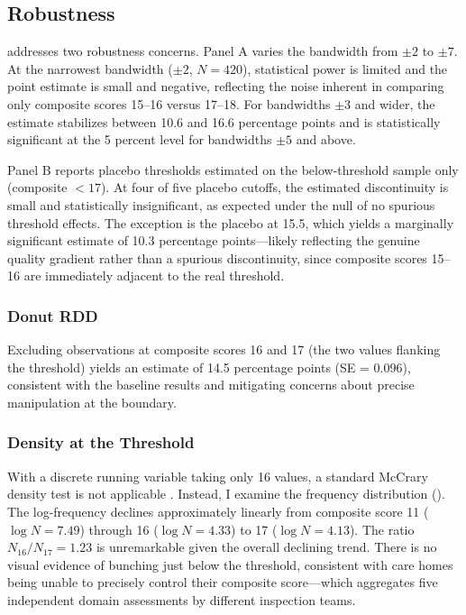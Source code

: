 \documentclass[12pt]{article}
\begin{document}
\subsection{Robustness}



 addresses two robustness concerns. Panel A varies the bandwidth from $\pm 2$ to $\pm 7$. At the narrowest bandwidth ($\pm 2$, $N = 420$), statistical power is limited and the point estimate is small and negative, reflecting the noise inherent in comparing only composite scores 15--16 versus 17--18. For bandwidths $\pm 3$ and wider, the estimate stabilizes between 10.6 and 16.6 percentage points and is statistically significant at the 5 percent level for bandwidths $\pm 5$ and above.

Panel B reports placebo thresholds estimated on the below-threshold sample only (composite $< 17$). At four of five placebo cutoffs, the estimated discontinuity is small and statistically insignificant, as expected under the null of no spurious threshold effects. The exception is the placebo at 15.5, which yields a marginally significant estimate of 10.3 percentage points---likely reflecting the genuine quality gradient rather than a spurious discontinuity, since composite scores 15--16 are immediately adjacent to the real threshold.

\subsubsection*{Donut RDD} Excluding observations at composite scores 16 and 17 (the two values flanking the threshold) yields an estimate of 14.5 percentage points (SE = 0.096), consistent with the baseline results and mitigating concerns about precise manipulation at the boundary.

\subsubsection*{Density at the Threshold} With a discrete running variable taking only 16 values, a standard McCrary density test is not applicable \citep{kolesar2018inference}. Instead, I examine the frequency distribution (). The log-frequency declines approximately linearly from composite score 11 ($\log N = 7.49$) through 16 ($\log N = 4.33$) to 17 ($\log N = 4.13$). The ratio $N_{16}/N_{17} = 1.23$ is unremarkable given the overall declining trend. There is no visual evidence of bunching just below the threshold, consistent with care homes being unable to precisely control their composite score---which aggregates five independent domain assessments by different inspection teams.
\end{document}
